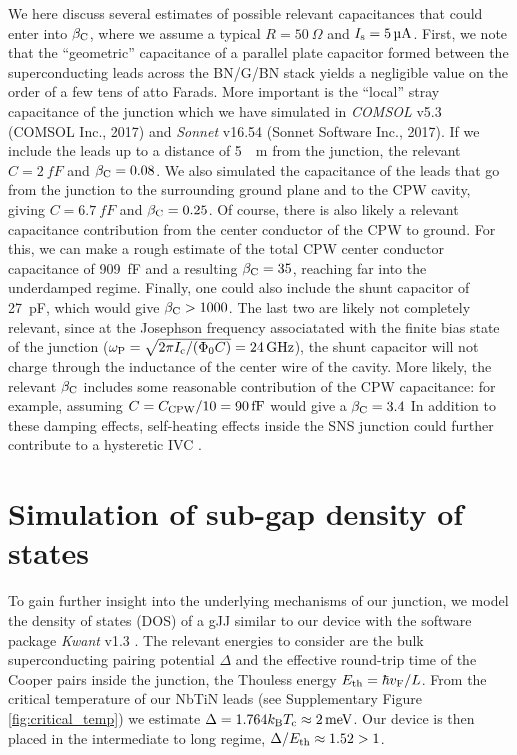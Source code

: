 \documentclass[preprint,
  onecolumn,
  notitlepage,
  amsmath,amssymb,
  aip,
  apl,
]{revtex4-1}
\begin{document}
We here discuss several estimates of possible relevant capacitances that could enter into $\beta_{\rm C}$, where we assume a typical $R=\SI{50}{\Omega}$ and $I_{\rm s}=\SI{5}{\micro A}$.
First, we note that the ``geometric'' capacitance of a parallel plate capacitor formed between the superconducting leads across the BN/G/BN stack yields a negligible value on the order of a few tens of atto Farads.
More important is the ``local'' stray capacitance of the junction which we have simulated in \textit{COMSOL} v5.3 (COMSOL Inc., 2017) and \textit{Sonnet} v16.54 (Sonnet Software Inc., 2017).
If we include the leads up to a distance of \SI{5}{\mu m} from the junction, the relevant $C=\SI{2}{fF}$ and $\beta_{\rm C}=0.08$.
We also simulated the capacitance of the leads that go from the junction to the surrounding ground plane and to the CPW cavity, giving $C=\SI{6.7}{fF}$ and $\beta_{\rm C}=0.25$.
Of course, there is also likely a relevant capacitance contribution from the center conductor of the CPW to ground.
For this, we can make a rough estimate of the total CPW center conductor capacitance of \SI{909}{fF} and a resulting $\beta_{\rm C}=35$, reaching far into the underdamped regime.
Finally, one could also include the shunt capacitor of \SI{27}{pF}, which would give $\beta_{\rm C}>1000$. 
The last two are likely not completely relevant, since at the Josephson frequency associatated with the finite bias state of the junction ($\omega_{\rm P}=\sqrt{2\pi I_{\rm c}/(\Phi_0 C)}=\SI{24}{GHz}$), the shunt capacitor will not charge through the inductance of the center wire of the cavity. 
More likely, the relevant $\beta_{\rm C}$ includes some reasonable contribution of the CPW capacitance: for example, assuming $C = C_{\rm CPW} / 10 = \SI{90}{fF}$ would give a $\beta_{\rm C} = 3.4$
In addition to these damping effects, self-heating effects inside the SNS junction could further contribute to a hysteretic IVC \cite{courtois_origin_2008,borzenets_phonon_2013}.




\section{Simulation of sub-gap density of states}\label{sec:subgap}
\noindent To gain further insight into the underlying mechanisms of our junction, we model the density of states (DOS) of a gJJ similar to our device with the software package \textit{Kwant} v1.3 \cite{groth_kwant_2014}.
The relevant energies to consider are the bulk superconducting pairing potential $\Delta$ and the effective round-trip time of the Cooper pairs inside the junction, the Thouless energy $E_{\rm th}=\hbar v_{\rm F}/L$.
From the critical temperature of our NbTiN leads (see Supplementary Figure \ref{fig:critical_temp}) we estimate\cite{tinkham_introduction_1996} $\Delta=1.764k_{\rm B} T_{\rm c}\approx\SI{2}{meV}$.
Our device is then placed in the intermediate to long regime, $\Delta/E_{\rm th}\approx1.52>1$.
\end{document}
